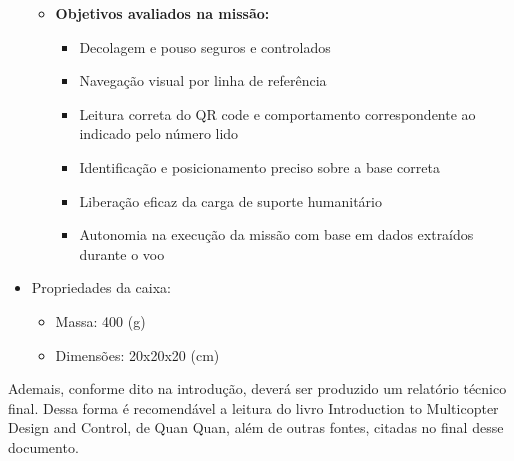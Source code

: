 \begin{itemize}
\begin{itemize}
        \item \textbf{Objetivos avaliados na missão:} 
        \begin{itemize}
            \item Decolagem e pouso seguros e controlados
            \item Navegação visual por linha de referência
            \item Leitura correta do QR code {\color{red}e comportamento correspondente ao indicado pelo número lido}
            \item {\color{red}Identificação e} posicionamento preciso sobre a base correta
            \item Liberação eficaz da carga de suporte humanitário
            \item Autonomia na execução da missão com base em dados extraídos durante o voo
        \end{itemize}
    \end{itemize}

    \item {\color{red} Propriedades da caixa:
    
    \begin{itemize}
        \item Massa: 400 (g)
        \item Dimensões: 20x20x20 (cm)
    \end{itemize}}
\end{itemize}

Ademais, conforme dito na introdução, deverá ser produzido um relatório técnico final. Dessa forma é recomendável a leitura do livro Introduction to Multicopter Design and Control, de Quan Quan, além de outras fontes, citadas no final desse documento.

